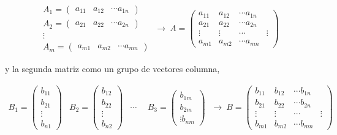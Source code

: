 \begin{equation*}
\begin{aligned}
A_1=\begin{pmatrix}
a_{11}& a_{12}& \cdots a_{1n}
\end{pmatrix}\\
A_2=\begin{pmatrix}
a_{21}& a_{22}& \cdots a_{2n}
\end{pmatrix}\\
\vdots \  \ \   \  \  \  \ \ \ \ \\
A_m=\begin{pmatrix}
a_{m1}& a_{m2}& \cdots a_{mn}
\end{pmatrix}
\end{aligned} \ \rightarrow \ 
A=\begin{pmatrix}
a_{11}& a_{12}& \cdots a_{1n}\\
a_{21}& a_{22}& \cdots a_{2n}\\
\vdots& \vdots& \cdots& \vdots \\
a_{m1}& a_{m2}& \cdots a_{mn}
\end{pmatrix}
\end{equation*}
\begin{paracol}{2}
y la segunda matriz como un grupo de vectores columna,    
\end{paracol}

\begin{equation*}
\begin{aligned}
B_1=\begin{pmatrix}
b_{11}\\ b_{21}\\ \vdots \\ b_{n1}
\end{pmatrix}&
B_2=\begin{pmatrix}
b_{12}\\ b_{22}\\ \vdots\\ b_{n2}
\end{pmatrix} &
\cdots  \  \  &
B_3=\begin{pmatrix}
b_{1m}\\ b_{2m}\\ \vdots  b_{nm}
\end{pmatrix}
\end{aligned} \ \rightarrow \ 
B=\begin{pmatrix}
b_{11}& b_{12}& \cdots b_{1n}\\
b_{21}& b_{22}& \cdots b_{2n}\\
\vdots& \vdots& \cdots& \vdots \\
b_{m1}& b_{m2}& \cdots b_{mn}
\end{pmatrix}
\end{equation*}

